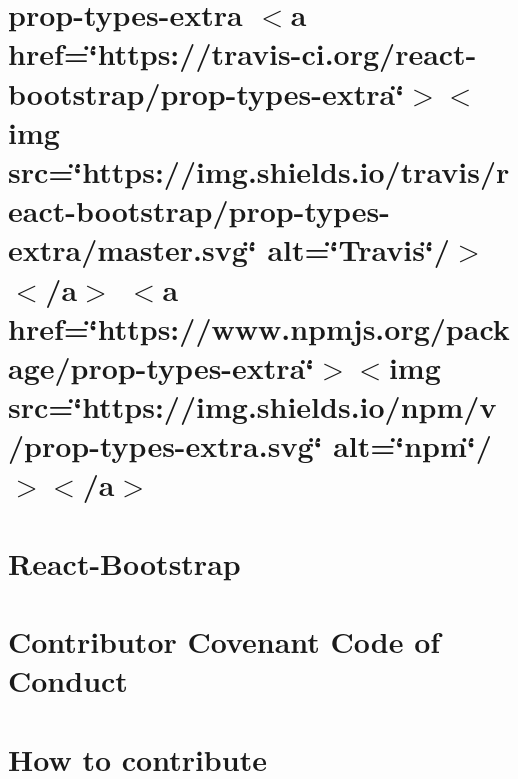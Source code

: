 \let\mypdfximage\pdfximage\def\pdfximage{\immediate\mypdfximage}\documentclass[twoside]{book}
\newcommand{\+}{\discretionary{\mbox{\scriptsize$\hookleftarrow$}}{}{}}
\begin{document}
\chapter{prop-\/types-\/extra $<$a href=\char`\"{}https\+://travis-\/ci.\+org/react-\/bootstrap/prop-\/types-\/extra\char`\"{}$>$$<$img src=\char`\"{}https\+://img.\+shields.\+io/travis/react-\/bootstrap/prop-\/types-\/extra/master.\+svg\char`\"{} alt=\char`\"{}\+Travis\char`\"{}/$>$$<$/a$>$ $<$a href=\char`\"{}https\+://www.\+npmjs.\+org/package/prop-\/types-\/extra\char`\"{}$>$$<$img src=\char`\"{}https\+://img.\+shields.\+io/npm/v/prop-\/types-\/extra.\+svg\char`\"{} alt=\char`\"{}npm\char`\"{}/$>$$<$/a$>$}
\label{md__c___users_zhart__one_drive__desktop_school_capstone_workspace_capstone_flight_risk_assesment26e797a629d6f50998542554fa421034}

\chapter{React-\/\+Bootstrap}
\label{md__c___users_zhart__one_drive__desktop_school_capstone_workspace_capstone_flight_risk_assesment444920fc0b77bc70ea54c5c8ec172ea7}

\chapter{Contributor Covenant Code of Conduct}
\label{md__c___users_zhart__one_drive__desktop_school_capstone_workspace_capstone_flight_risk_assesmentf5ac78076903e849b93d30cc9b7bd7da}

\chapter{How to contribute}
\label{md__c___users_zhart__one_drive__desktop_school_capstone_workspace_capstone_flight_risk_assesmenta10553d3c11ffaa720d249b5ceb0288d}

\end{document}
